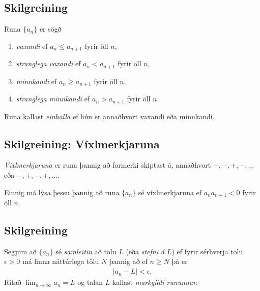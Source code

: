 \documentclass[b5paper,11pt,icelandic]{sphinxmanual}
\begin{document}
\subsection{Skilgreining}
\label{kafli09:index-2}\label{kafli09:id1}
Runa \(\{a_n\}\) er sögð
\begin{enumerate}
\item {} 
\emph{vaxandi} ef \(a_n\leq a_{n+1}\) fyrir öll \(n\),

\item {} 
\emph{stranglega vaxandi} ef \(a_n< a_{n+1}\) fyrir öll \(n\),

\item {} 
\emph{minnkandi} ef \(a_n\geq a_{n+1}\) fyrir öll \(n\),

\item {} 
\emph{stranglega minnkandi} ef \(a_n> a_{n+1}\) fyrir öll
\(n\).

\end{enumerate}

Runa kallast \emph{einhalla} ef hún er annaðhvort vaxandi eða minnkandi.


\subsection{Skilgreining: Víxlmerkjaruna}
\label{kafli09:skilgreining-vixlmerkjaruna}\label{kafli09:index-3}
\emph{Víxlmerkjaruna} er runa þannig að formerki skiptast á, annaðhvort
\(+, -, +, -, \ldots\) eða \(-, +, -, +, \ldots\).

Einnig má lýsa þessu þannig að runa \(\{a_n\}\) sé víxlmerkjaruna ef
\(a_na_{n+1}<0\) fyrir öll \(n\).


\subsection{Skilgreining}
\label{kafli09:id2}\label{kafli09:index-4}
Segjum að \(\{a_n\}\) sé \emph{samleitin} að tölu \(L\) (eða \emph{stefni
á} \(L\)) ef fyrir sérhverja tölu \(\epsilon>0\) má finna
náttúrlega tölu \(N\) þannig að ef \(n\geq N\) þá er
\begin{equation*}
\begin{split}|a_n-L|<\epsilon.\end{split}
\end{equation*}
Ritað \(\lim_{n\rightarrow \infty}a_n=L\) og talan \(L\) kallast
\emph{markgildi rununnar}.
\end{document}
